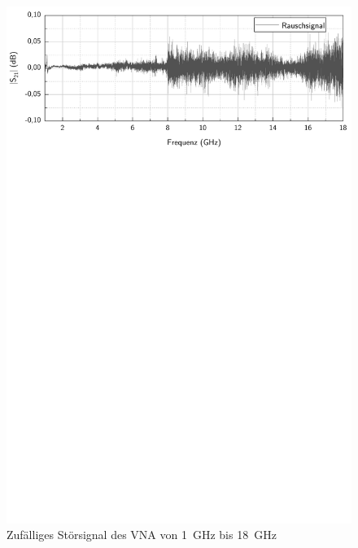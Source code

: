 \begin{figure}[ht]
    \centering
    \includegraphics[page = 1, width = .99\textwidth, trim = 0cm 18.05cm 0.3cm 0.05cm, clip]{Abbildungen/Kapitel4/Rauschsignal.pdf}
    \caption{Zufälliges Störsignal des VNA von \SI{1}{\giga\hertz} bis \SI{18}{\giga\hertz}}
    \label{fig:4_Stoersignal}
\end{figure}


